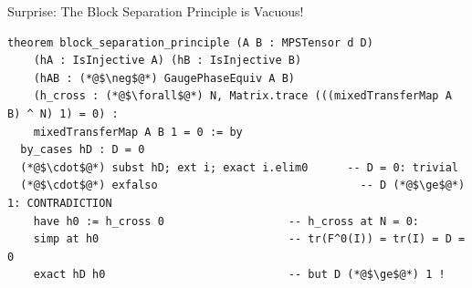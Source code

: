 \documentclass[aspectratio=169,10pt]{beamer}
\begin{document}
\begin{frame}[fragile]{Surprise: The Block Separation Principle is Vacuous!}
\vspace{-0.3em}
\begin{lstlisting}[basicstyle=\ttfamily\fontsize{5.5}{7}\selectfont\color{white}]
theorem block_separation_principle (A B : MPSTensor d D)
    (hA : IsInjective A) (hB : IsInjective B)
    (hAB : (*@$\neg$@*) GaugePhaseEquiv A B)
    (h_cross : (*@$\forall$@*) N, Matrix.trace (((mixedTransferMap A B) ^ N) 1) = 0) :
    mixedTransferMap A B 1 = 0 := by
  by_cases hD : D = 0
  (*@$\cdot$@*) subst hD; ext i; exact i.elim0      -- D = 0: trivial
  (*@$\cdot$@*) exfalso                               -- D (*@$\ge$@*) 1: CONTRADICTION
    have h0 := h_cross 0                   -- h_cross at N = 0:
    simp at h0                             -- tr(F^0(I)) = tr(I) = D = 0
    exact hD h0                            -- but D (*@$\ge$@*) 1 !
\end{lstlisting}

\vspace{0.3em}
\begin{center}
\end{center}
\end{frame}
\end{document}
